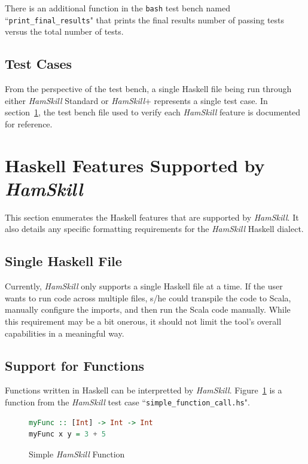 \documentclass{report}
\begin{document}
There is an additional function in the \texttt{bash} test bench named ``\texttt{print\_final\_results}" that prints the final results number of passing tests versus the total number of tests.

\subsection{Test Cases}

From the perspective of the test bench, a single Haskell file being run through either \textit{HamSkill} Standard or \textit{HamSkill}+ represents a single test case.  In section~\ref{sec:hamskillFeatures}, the test bench file used to verify each \textit{HamSkill} feature is documented for reference.

\section{Haskell Features Supported by \textit{HamSkill}}\label{sec:hamskillFeatures}

This section enumerates the Haskell features that are supported by \textit{HamSkill}.  It also details any specific formatting requirements for the \textit{HamSkill} Haskell dialect.

\subsection{Single Haskell File}

Currently, \textit{HamSkill} only supports a single Haskell file at a time.  If the user wants to run code across multiple files, s/he could transpile the code to Scala, manually configure the imports, and then run the Scala code manually.  While this requirement may be a bit onerous, it should not limit the tool's overall capabilities in a meaningful way.

\subsection{Support for Functions}

Functions written in Haskell can be interpretted by \textit{HamSkill}.  Figure~\ref{fig:myFunctionHaskell} is a function from the \textit{HamSkill} test case ``\texttt{simple\_function\_call.hs}".

\begin{figure}[H]
\begin{mdframed}
\begin{lstlisting}[language=Haskell]
myFunc :: [Int] -> Int -> Int
myFunc x y = 3 + 5
\end{lstlisting}
\end{mdframed}
\caption{Simple \textit{HamSkill} Function}\label{fig:myFunctionHaskell}
\end{figure}
\end{document}
